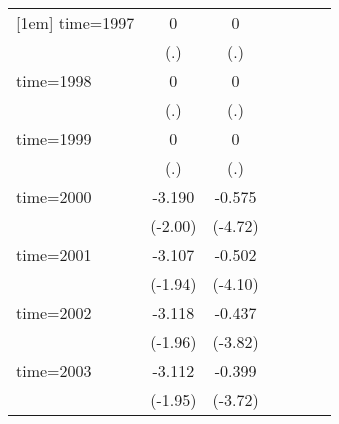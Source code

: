 \begin{table}[htbp]
\begin{tabular}{l*{6}{c}}
[1em]
time=1997           &           0         &           0         &                     &                     &                     &                     \\
                    &         (.)         &         (.)         &                     &                     &                     &                     \\
[1em]
time=1998           &           0         &           0         &                     &                     &                     &                     \\
                    &         (.)         &         (.)         &                     &                     &                     &                     \\
[1em]
time=1999           &           0         &           0         &                     &                     &                     &                     \\
                    &         (.)         &         (.)         &                     &                     &                     &                     \\
[1em]
time=2000           &      -3.190\sym{*}  &      -0.575\sym{***}&                     &                     &                     &                     \\
                    &     (-2.00)         &     (-4.72)         &                     &                     &                     &                     \\
[1em]
time=2001           &      -3.107\sym{*}  &      -0.502\sym{***}&                     &                     &                     &                     \\
                    &     (-1.94)         &     (-4.10)         &                     &                     &                     &                     \\
[1em]
time=2002           &      -3.118\sym{*}  &      -0.437\sym{***}&                     &                     &                     &                     \\
                    &     (-1.96)         &     (-3.82)         &                     &                     &                     &                     \\
[1em]
time=2003           &      -3.112\sym{*}  &      -0.399\sym{***}&                     &                     &                     &                     \\
                    &     (-1.95)         &     (-3.72)         &                     &                     &                     &                     \\

\end{tabular}
\end{table}
